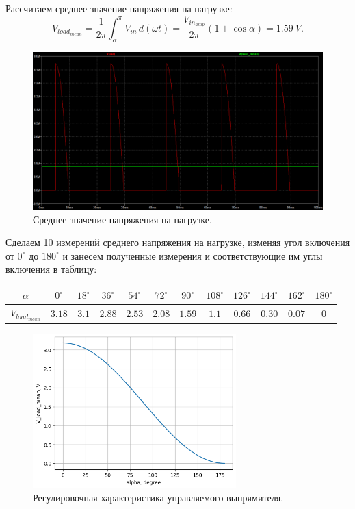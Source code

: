 \documentclass[12pt]{article}
\begin{document}
Рассчитаем среднее значение напряжения на нагрузке:
\[
    V_{load_{mean}} = \frac{1}{2\pi} \int_{\alpha}^{\pi} V_{in} \,d(\omega t) = \frac{V_{{in}_{amp}}}{2\pi}(1+\cos{\alpha}) = 1.59 \ V.
\]

\begin{figure}[H]
    \centering
    \includegraphics[width=\textwidth]{1_out_mean_v.png}
    \caption{Среднее значение напряжения на нагрузке.}
    \label{fig:1_out_mean_v}
\end{figure}

Сделаем 10 измерений среднего напряжения на нагрузке, изменяя угол включения от $0^\circ$ до $180^\circ$ и занесем полученные измерения и соответствующие им углы включения в таблицу:

\begin{center}
\begin{tabular}{ c|c c c c c c c c c c c } 
 $\alpha$ & $0^\circ$ & $18^\circ$ & $36^\circ$ & $54^\circ$ & $72^\circ$ & $90^\circ$ & $108^\circ$ & $126^\circ$ & $144^\circ$ & $162^\circ$ & $180^\circ$ \\ 
 \hline
 $V_{load_{mean}}$ & $3.18$ & $3.1$ & $2.88$ & $2.53$ & $2.08$ & $1.59$ & $1.1$ & $0.66$ & $0.30$ & $0.07$ & $0$ \\ 
\end{tabular}
\end{center}

\begin{figure}[H]
    \centering
    \includegraphics[width=0.7\textwidth]{v_load_mean_degree.png}
    \caption{Регулировочная характеристика управляемого выпрямителя.}
    \label{fig:v_load_mean_degree}
\end{figure}
\end{document}
